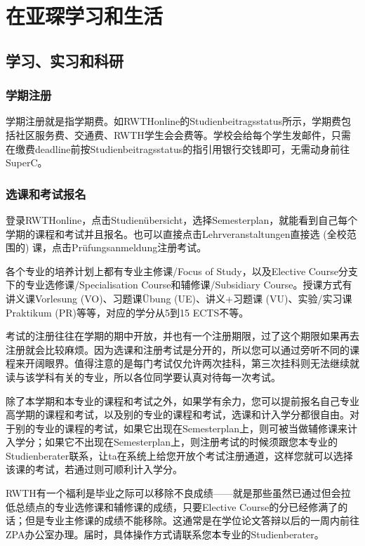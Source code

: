 
\chapter{在亚琛学习和生活}

\section{学习、实习和科研}

  \subsection{学期注册}

    学期注册就是指学期费。如RWTHonline的Studienbeitragsstatus所示，学期费包括社区服务费、交通费、RWTH学生会会费等。学校会给每个学生发邮件，只需在缴费deadline前按Studienbeitragsstatus的指引用银行交钱即可，无需动身前往SuperC。

  \subsection{选课和考试报名}

    登录RWTHonline，点击Studienübersicht，选择Semesterplan，就能看到自己每个学期的课程和考试并且报名。也可以直接点击Lehrveranstaltungen直接选 (全校范围的) 课，点击Prüfungsanmeldung注册考试。

    各个专业的培养计划上都有专业主修课/Focus of Study，以及Elective Course分支下的专业选修课/Specialisation Course和辅修课/Subsidiary Course。授课方式有讲义课Vorlesung (VO)、习题课Übung (UE)、讲义+习题课 (VU)、实验/实习课Praktikum (PR)等等，对应的学分从5到15 ECTS不等。

    考试的注册往往在学期的期中开放，并也有一个注册期限，过了这个期限如果再去注册就会比较麻烦。因为选课和注册考试是分开的，所以您可以通过旁听不同的课程来开阔眼界。值得注意的是每门考试仅允许两次挂科，第三次挂科则无法继续就读与该学科有关的专业，所以各位同学要认真对待每一次考试。

    除了本学期和本专业的课程和考试之外，如果学有余力，您可以提前报名自己专业高学期的课程和考试，以及别的专业的课程和考试，选课和计入学分都很自由。对于别的专业的课程的考试，如果它出现在Semesterplan上，则可被当做辅修课来计入学分；如果它不出现在Semesterplan上，则注册考试的时候须跟您本专业的Studienberater联系，让ta在系统上给您开放个考试注册通道，这样您就可以选择该课的考试，若通过则可顺利计入学分。

    RWTH有一个福利是毕业之际可以移除不良成绩——就是那些虽然已通过但会拉低总绩点的专业选修课和辅修课的成绩，只要Elective Course的分已经修满了的话；但是专业主修课的成绩不能移除。这通常是在学位论文答辩以后的一周内前往ZPA办公室办理。届时，具体操作方式请联系您本专业的Studienberater。

